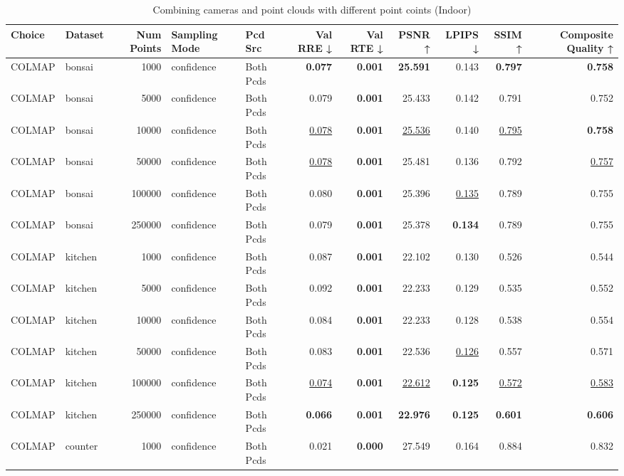 \begin{table}[H]
\caption{\ifdefined\customcaption \customcaption \else Combining cameras and point clouds with different point coints (Indoor) \fi}
\label{tab:07_combined_num_points_indoor}
\centering
\scriptsize
\begin{tabular}{llrllrrrrrr}
\toprule
Choice & Dataset & Num Points & Sampling Mode & Pcd Src & Val RRE ↓ & Val RTE ↓ & PSNR ↑ & LPIPS ↓ & SSIM ↑ & Composite Quality ↑ \\
\midrule
COLMAP & bonsai & 1000 & confidence & Both Pcds & \textbf{0.077} & \textbf{0.001} & \textbf{25.591} & 0.143 & \textbf{0.797} & \textbf{0.758} \\
COLMAP & bonsai & 5000 & confidence & Both Pcds & 0.079 & \textbf{0.001} & 25.433 & 0.142 & 0.791 & 0.752 \\
COLMAP & bonsai & 10000 & confidence & Both Pcds & \underline{0.078} & \textbf{0.001} & \underline{25.536} & 0.140 & \underline{0.795} & \textbf{0.758} \\
COLMAP & bonsai & 50000 & confidence & Both Pcds & \underline{0.078} & \textbf{0.001} & 25.481 & 0.136 & 0.792 & \underline{0.757} \\
COLMAP & bonsai & 100000 & confidence & Both Pcds & 0.080 & \textbf{0.001} & 25.396 & \underline{0.135} & 0.789 & 0.755 \\
COLMAP & bonsai & 250000 & confidence & Both Pcds & 0.079 & \textbf{0.001} & 25.378 & \textbf{0.134} & 0.789 & 0.755 \\
\midrule
COLMAP & kitchen & 1000 & confidence & Both Pcds & 0.087 & \textbf{0.001} & 22.102 & 0.130 & 0.526 & 0.544 \\
COLMAP & kitchen & 5000 & confidence & Both Pcds & 0.092 & \textbf{0.001} & 22.233 & 0.129 & 0.535 & 0.552 \\
COLMAP & kitchen & 10000 & confidence & Both Pcds & 0.084 & \textbf{0.001} & 22.233 & 0.128 & 0.538 & 0.554 \\
COLMAP & kitchen & 50000 & confidence & Both Pcds & 0.083 & \textbf{0.001} & 22.536 & \underline{0.126} & 0.557 & 0.571 \\
COLMAP & kitchen & 100000 & confidence & Both Pcds & \underline{0.074} & \textbf{0.001} & \underline{22.612} & \textbf{0.125} & \underline{0.572} & \underline{0.583} \\
COLMAP & kitchen & 250000 & confidence & Both Pcds & \textbf{0.066} & \textbf{0.001} & \textbf{22.976} & \textbf{0.125} & \textbf{0.601} & \textbf{0.606} \\
\midrule
COLMAP & counter & 1000 & confidence & Both Pcds & 0.021 & \textbf{0.000} & 27.549 & 0.164 & 0.884 & 0.832 \\

\end{tabular}
\end{table}
